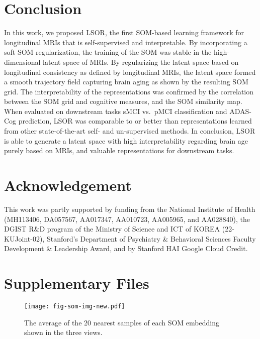 \documentclass[runningheads]{llncs}
\begin{document}
\section{Conclusion}
In this work, we proposed LSOR, the first SOM-based learning framework for longitudinal MRIs that is self-supervised and interpretable. By incorporating a soft SOM regularization, the training of the SOM was stable in the high-dimensional latent space of MRIs. By regularizing the latent space based on longitudinal consistency as defined by longitudinal MRIs, the latent space formed a smooth trajectory field capturing brain aging as shown by the resulting SOM grid. The interpretability of the representations was confirmed by the correlation between the SOM grid and cognitive measures, and the SOM similarity map. When evaluated on downstream tasks sMCI vs.~pMCI classification and ADAS-Cog prediction, LSOR was comparable to or better than representations learned from other state-of-the-art self- and un-supervised methods. In conclusion, LSOR is able to generate a latent space with high interpretability regarding brain age purely based on MRIs, and valuable representations for downstream tasks. 

\section*{Acknowledgement}
 This work was partly supported by funding from the National Institute of Health (MH113406, DA057567, AA017347, AA010723, AA005965, and AA028840), the DGIST R\&D program of the Ministry of Science and ICT of KOREA (22-KUJoint-02), Stanford's Department of Psychiatry \& Behavioral Sciences Faculty Development \& Leadership Award, and by  Stanford HAI Google Cloud Credit. 

%
%




\newpage
\section*{Supplementary Files}
\setcounter{table}{0}
\renewcommand{\thetable}{S\arabic{table}}
\setcounter{figure}{0}
\renewcommand{\thefigure}{S\arabic{figure}}

\begin{figure}
\centering
\texttt{[image: fig-som-img-new.pdf]}
\vspace{-10pt}
\caption{The average of the 20 nearest samples of each SOM embedding shown in the three views.}
\label{fig:som-img}
\end{figure}
\end{document}
